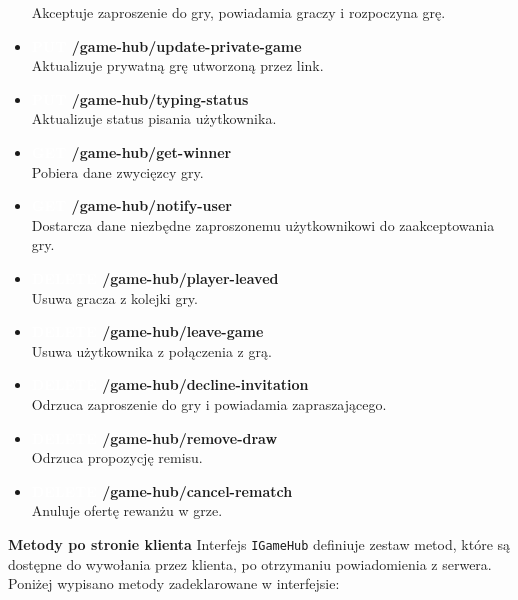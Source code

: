 \documentclass[12pt,a4paper]{article}
\begin{document}
\begin{itemize}
    Akceptuje zaproszenie do gry, powiadamia graczy i rozpoczyna grę.
    \item \textbf{\colorbox{orange!90}{\textcolor{white}{PUT}} /game-hub/update-private-game}\\
    Aktualizuje prywatną grę utworzoną przez link.
    \item \textbf{\colorbox{orange!90}{\textcolor{white}{PUT}} /game-hub/typing-status}\\
    Aktualizuje status pisania użytkownika.
    \item \textbf{\colorbox{cyan!90}{\textcolor{white}{GET}} /game-hub/get-winner}\\
    Pobiera dane zwycięzcy gry.
    \item \textbf{\colorbox{cyan!90}{\textcolor{white}{GET}} /game-hub/notify-user}\\
    Dostarcza dane niezbędne zaproszonemu użytkownikowi do zaakceptowania gry.
    \item \textbf{\colorbox{red!90}{\textcolor{white}{DELETE}} /game-hub/player-leaved}\\
    Usuwa gracza z kolejki gry.
    \item \textbf{\colorbox{red!90}{\textcolor{white}{DELETE}} /game-hub/leave-game}\\
    Usuwa użytkownika z połączenia z grą.
    \item \textbf{\colorbox{red!90}{\textcolor{white}{DELETE}} /game-hub/decline-invitation}\\
    Odrzuca zaproszenie do gry i powiadamia zapraszającego.
    \item \textbf{\colorbox{red!90}{\textcolor{white}{DELETE}} /game-hub/remove-draw}\\
    Odrzuca propozycję remisu.
    \item \textbf{\colorbox{red!90}{\textcolor{white}{DELETE}} /game-hub/cancel-rematch}\\
    Anuluje ofertę rewanżu w grze.
\end{itemize}

\newpage

\noindent \textbf{Metody po stronie klienta}
Interfejs \texttt{IGameHub} definiuje zestaw metod, które są dostępne do wywołania przez klienta, po otrzymaniu powiadomienia z serwera. Poniżej wypisano metody zadeklarowane w interfejsie:
\end{document}
